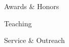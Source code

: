 \documentclass{cv} %
\begin{document}








\begin{rSection}{Awards \& Honors}
\end{rSection}

\begin{rSection}{Teaching}
\end{rSection}

\begin{rSection}{Service \& Outreach}
\end{rSection}
\end{document}
